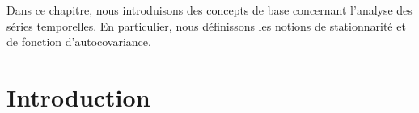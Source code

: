 
Dans ce chapitre, nous introduisons des concepts de base concernant
l'analyse des s\'eries temporelles. En particulier, nous d\'efinissons
les notions de stationnarit\'e et de fonction d'autocovariance.

\section{Introduction}

%




